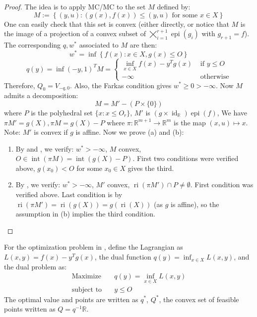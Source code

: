 \begin{proof}
	The idea is to apply MC/MC to the set $M$ defined by:
	\[
		M:=\left\{
		(y,u):(g(x),f(x))\leq (y,u)\text{ for some }x\in X
		\right\}
	\]
	One can easily check that this set is convex (either directly, or notice that $M$ is the image of a projection of a convex subset of $\bigtimes_{i=1}^{r+1} \operatorname{epi}(g_i)$ with $g_{r+1}=f$). The corresponding $q,w^\ast$ associated to $M$ are then:
	\[
		w^\ast = \inf \left\{f(x):x\in X,g(x)\leq O\right\}
	\]
	\[
		q(y) = \inf (-y,1)^TM = \begin{cases}
			\inf_{x\in X} f(x)-y^Tg(x) & \text{ if }y\leq O \\
			-\infty                    & \text{ otherwise}
		\end{cases}
	\]
	Therefore, $Q_0=V_{-q,0}$. Also, the Farkas condition gives $w^\ast \geq 0 > -\infty$. Now $M$ admits a decomposition:
	\[
		M=M'-\left(P\times \{0\}\right)
	\]
	where $P$ is the polyhedral set $\{x:x\leq O_r\}$, $M'$ is $\left(g\times {\operatorname{id}}_{\mathbb{R}}\right)\operatorname{epi}(f)$, We have $\pi M'=g(X),\pi M=g(X)-P$ where $\pi: \mathbb{R}^{m+1}\to \mathbb{R}^m$ is the map $(x,u)\mapsto x$. Note: $M'$ is convex if $g$ is affine. Now we prove (a) and (b):
	\begin{enumerate}[label=(\alph*)]
		\item By  and , we verify: $w^\ast>-\infty$, $M$ convex, $O\in \operatorname{int}(\pi M)=\operatorname{int}(g(X)-P)$. First two conditions were verified above, $g(x_0)<O$ for some $x_0\in X$ gives the third.
		\item By , we verify: $w^\ast>-\infty$, $M'$ convex, $\operatorname{ri}(\pi M')\cap P\neq\emptyset$. First condition was verified above. Last condition is by $\operatorname{ri}(\pi M')=\operatorname{ri}(g(X))=g(\operatorname{ri}(X))$ (as $g$ is affine), so the assumption in (b) implies the third condition. \qedhere
	\end{enumerate}
\end{proof}

\begin{defn}\label{defn:041-lagrangian-dual-prob}
	For the optimization problem in , define the Lagrangian as $L(x,y)=f(x)-y^Tg(x)$, the dual function $q(y)=\inf_{x\in X}L(x,y)$, and the dual problem as:
	\begin{align*}
		\text{Maximize}\quad   & q(y)=\inf_{x\in X}L(x,y) \\
		\text{subject to}\quad & y\leq O
	\end{align*}
	The optimal value and points are written as $q^\ast$, $Q^\ast$, the convex set of feasible points written as $Q=q^{-1}\mathbb{R}$.
\end{defn}

